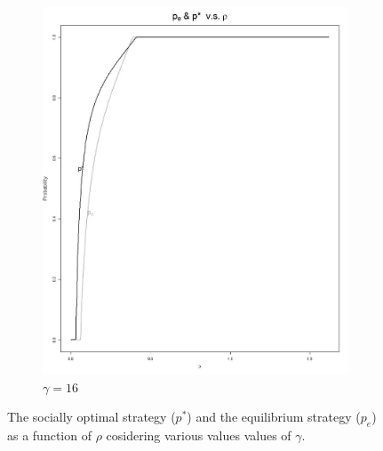 \documentclass[11pt]{article}
\numberwithin{equation}{section}
\begin{document}
\begin{figure}[h!]
\begin{subfigure}[b]{0.49\textwidth}
	\includegraphics[width=\textwidth]{plots/pe_vs_pstar_16.png}
		\caption{$\gamma=16$}
	\end{subfigure}
	\caption{The socially optimal strategy ($p^*$) and the equilibrium strategy ($p_e$) as a function of $\rho$ cosidering various values values of $\gamma$.}\label{p_e and p*}
\end{figure}
\end{document}
